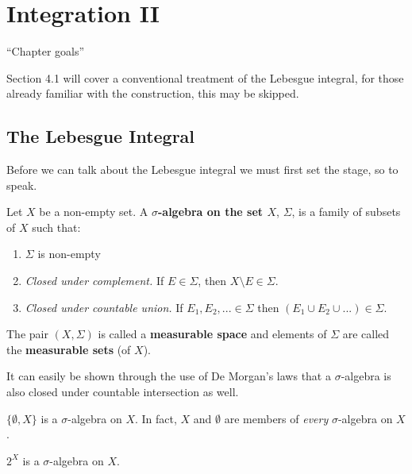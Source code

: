 \def\ind[#1]{\mathbb{I}_{#1}}
\def\extendedreal{\bar{\mathbb{R}}}
\def\hsetover[#1]{\mathbb{Z}^{#1}}

\chapter{Integration II} \label{integration}
\doublespacing

``Chapter goals''

Section 4.1 will cover a conventional treatment of the Lebesgue integral, for those already familiar with the construction, this may be skipped. 

%
%

\section{The Lebesgue Integral}

Before we can talk about the Lebesgue integral we must first set the stage, so to speak.



\begin{definition}
Let $X$ be a non-empty set. A \textbf{$\sigma$-algebra on the set $X$}, $\Sigma$,  is a family of subsets of $X$ such that:
\begin{enumerate}
\item $\Sigma$ is non-empty
\item \emph{Closed under complement.} If $E \in \Sigma$, then $X \setminus E \in \Sigma$.
\item \emph{Closed under countable union.} If $E_1, E_2, ... \in \Sigma$ then $(E_1 \cup E_2 \cup ... ) \in \Sigma$.
\end{enumerate}
The pair $(X, \Sigma)$ is called a \textbf{measurable space} and elements of $\Sigma$ are called the \textbf{measurable sets} (of $X$).
\end{definition}

It can easily be shown through the use of De Morgan's laws that a $\sigma$-algebra is also closed under countable intersection as well.
\begin{example}
$\{ \emptyset, X \}$ is a $\sigma$-algebra on $X$. In fact, $X$ and $\emptyset$ are members of \emph{every} $\sigma$-algebra on $X$.
\end{example}

\begin{example}
$2^X$ is a $\sigma$-algebra on $X$.
\end{example}

